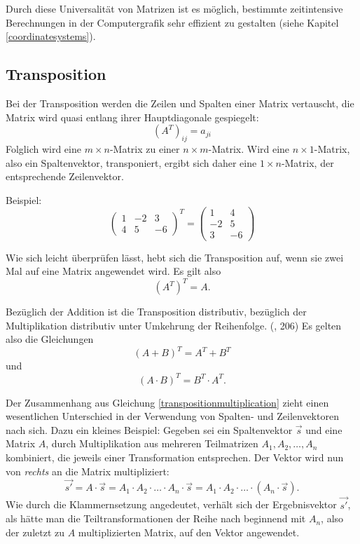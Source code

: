 Durch diese Universalität von Matrizen ist es möglich, bestimmte zeitintensive Berechnungen in der Computergrafik sehr effizient zu gestalten (siehe Kapitel \ref{coordinatesystems}).

\subsection{Transposition}
\label{transposition}
Bei der Transposition werden die Zeilen und Spalten einer Matrix vertauscht, die Matrix wird quasi entlang ihrer Hauptdiagonale gespiegelt:
\begin{equation}
 (A^T)_{ij} = a_{ji}
\end{equation} 
Folglich wird eine $m \times n$-Matrix zu einer $n \times m$-Matrix. Wird eine $n \times 1$-Matrix, also ein Spaltenvektor, transponiert, ergibt sich daher eine $1 \times n$-Matrix, der entsprechende Zeilenvektor.

Beispiel:
\begin{equation}
  \begin{pmatrix}
    1 & -2 & 3 \\
    4 & 5 & -6
  \end{pmatrix}^T
  =
  \begin{pmatrix}
    1 & 4 \\
    -2 & 5 \\
    3 & -6
  \end{pmatrix}
\end{equation}

Wie sich leicht überprüfen lässt, hebt sich die Transposition auf, wenn sie zwei Mal auf eine Matrix angewendet wird. Es gilt also
\begin{equation}
 (A^T)^T = A.
\end{equation}

Bezüglich der Addition ist die Transposition distributiv, bezüglich der Multiplikation distributiv unter Umkehrung der Reihenfolge. (\vgl \citep{bronstein}, 206) Es gelten also die Gleichungen
\begin{equation}
 (A + B)^T = A^T + B^T
\end{equation}
und
\begin{equation}
\label{transpositionmultiplication}
 (A \cdot B)^T = B^T \cdot A^T.
\end{equation}

Der Zusammenhang aus Gleichung \ref{transpositionmultiplication} zieht einen wesentlichen Unterschied in der Verwendung von Spalten- und Zeilenvektoren nach sich. Dazu ein kleines Beispiel: Gegeben sei ein Spaltenvektor $\vec s$ und eine Matrix $A$, durch Multiplikation aus mehreren Teilmatrizen $A_1, A_2, \dots, A_n$ kombiniert, die jeweils einer Transformation entsprechen. Der Vektor wird nun von \emph{rechts} an die Matrix multipliziert:
\begin{equation}
 \vec{s'} = A \cdot \vec{s} = A_1 \cdot A_2 \cdot \ldots \cdot A_n \cdot \vec{s} = A_1 \cdot A_2 \cdot \ldots \cdot \left( A_n \cdot \vec{s} \right).
\end{equation}
Wie durch die Klammernsetzung angedeutet, verhält sich der Ergebnisvektor $\vec{s'}$, als hätte man die Teiltransformationen der Reihe nach beginnend mit $A_n$, also der zuletzt zu $A$ multiplizierten Matrix, auf den Vektor angewendet.

